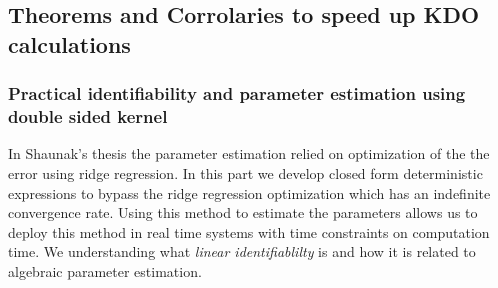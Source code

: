 \documentclass{article}
\begin{document}
\subsection{Theorems and Corrolaries  to speed up KDO calculations}
 \subsubsection{Practical identifiability and parameter estimation using double sided kernel }
In Shaunak's thesis the parameter estimation relied on optimization of the the error using ridge regression. In this part we develop closed form deterministic expressions to bypass the ridge regression optimization which has an indefinite convergence rate. Using this method to estimate the parameters allows us to deploy this method in real time systems with time constraints on computation time. We understanding what \textit{linear identifiablilty} is and how it is related to algebraic parameter estimation.  
\end{document}
